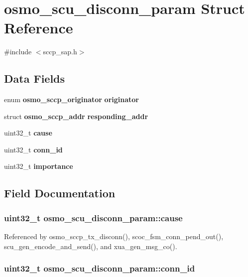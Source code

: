 \section{osmo\+\_\+scu\+\_\+disconn\+\_\+param Struct Reference}
\label{structosmo__scu__disconn__param}


{\ttfamily \#include $<$sccp\+\_\+sap.\+h$>$}

\subsection*{Data Fields}
\begin{DoxyCompactItemize}
\item 
enum {\bf osmo\+\_\+sccp\+\_\+originator} {\bf originator}
\item 
struct {\bf osmo\+\_\+sccp\+\_\+addr} {\bf responding\+\_\+addr}
\item 
uint32\+\_\+t {\bf cause}
\item 
uint32\+\_\+t {\bf conn\+\_\+id}
\item 
uint32\+\_\+t {\bf importance}
\end{DoxyCompactItemize}


\subsection{Field Documentation}
\subsubsection[{cause}]{\setlength{\rightskip}{0pt plus 5cm}uint32\+\_\+t osmo\+\_\+scu\+\_\+disconn\+\_\+param\+::cause}\label{structosmo__scu__disconn__param_af5af7c5768eb0584d58b482f50c5fe81}


Referenced by osmo\+\_\+sccp\+\_\+tx\+\_\+disconn(), scoc\+\_\+fsm\+\_\+conn\+\_\+pend\+\_\+out(), scu\+\_\+gen\+\_\+encode\+\_\+and\+\_\+send(), and xua\+\_\+gen\+\_\+msg\+\_\+co().

\subsubsection[{conn\+\_\+id}]{\setlength{\rightskip}{0pt plus 5cm}uint32\+\_\+t osmo\+\_\+scu\+\_\+disconn\+\_\+param\+::conn\+\_\+id}\label{structosmo__scu__disconn__param_a1488574c4d52fe293ae6f709c0eccb75}


